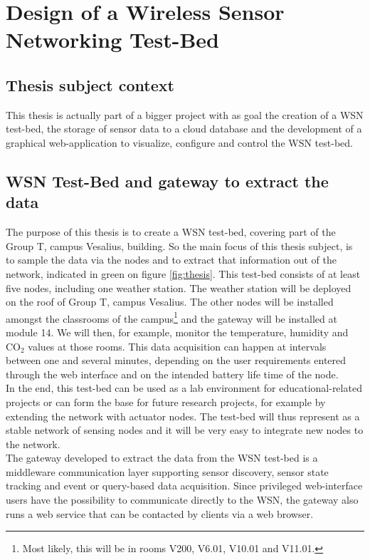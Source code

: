 \section{Design of a Wireless Sensor Networking Test-Bed}
\subsection{Thesis subject context}
This thesis is actually part of a bigger project with as goal the creation of a WSN test-bed, the storage of sensor data to a cloud database and the development of a graphical web-application to visualize, configure and control the WSN test-bed.

\subsection{WSN Test-Bed and gateway to extract the data}
\label{lab2}
The purpose of this thesis is to create a WSN test-bed, covering part of the Group T, campus Vesalius, building. So the main focus of this thesis subject, is to sample the data via the nodes and to extract that information out of the network, indicated in green on figure \ref{fig:thesis}. This test-bed consists of at least five nodes, including one weather station. The weather station will be deployed on the roof of Group T, campus Vesalius. The other nodes will be installed amongst the classrooms of the campus\footnote{Most likely, this will be in rooms V200, V6.01, V10.01 and V11.01.} and the gateway will be installed at module 14. We will then, for example, monitor the temperature, humidity and CO$_{2}$ values at those rooms. This data acquisition can happen at intervals between one and several minutes, depending on the user requirements entered through the web interface and on the intended battery life time of the node.\\
In the end, this test-bed can be used as a lab environment for educational-related projects or can form the base for future research projects, for example by extending the network with actuator nodes. The test-bed will thus represent as a stable network of sensing nodes and it will be very easy to integrate new nodes to the network.\\
The gateway developed to extract the data from the WSN test-bed is a middleware communication layer supporting sensor discovery, sensor state tracking and event or query-based data acquisition. Since privileged web-interface users have the possibility to communicate directly to the WSN, the gateway also runs a web service that can be contacted by clients via a web browser.\\
